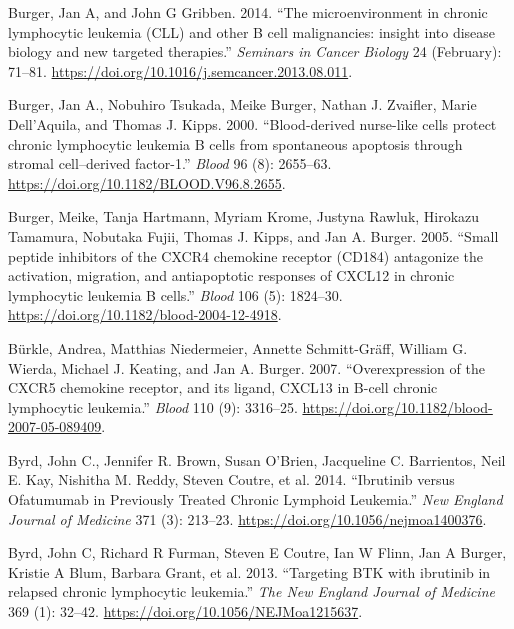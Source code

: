 \documentclass[11pt, a4paper, twosided]{book}
\newenvironment{CSLReferences}%
  {}%
  {\par}
\begin{document}
\begin{CSLReferences}{1}{0}
\leavevmode{}%
Burger, Jan A, and John G Gribben. 2014. {``{The microenvironment in chronic lymphocytic leukemia (CLL) and other B cell malignancies: insight into disease biology and new targeted therapies.}''} \emph{Seminars in Cancer Biology} 24 (February): 71--81. \url{https://doi.org/10.1016/j.semcancer.2013.08.011}.

\leavevmode{}%
Burger, Jan A., Nobuhiro Tsukada, Meike Burger, Nathan J. Zvaifler, Marie Dell'Aquila, and Thomas J. Kipps. 2000. {``{Blood-derived nurse-like cells protect chronic lymphocytic leukemia B cells from spontaneous apoptosis through stromal cell--derived factor-1}.''} \emph{Blood} 96 (8): 2655--63. \url{https://doi.org/10.1182/BLOOD.V96.8.2655}.

\leavevmode{}%
Burger, Meike, Tanja Hartmann, Myriam Krome, Justyna Rawluk, Hirokazu Tamamura, Nobutaka Fujii, Thomas J. Kipps, and Jan A. Burger. 2005. {``{Small peptide inhibitors of the CXCR4 chemokine receptor (CD184) antagonize the activation, migration, and antiapoptotic responses of CXCL12 in chronic lymphocytic leukemia B cells}.''} \emph{Blood} 106 (5): 1824--30. \url{https://doi.org/10.1182/blood-2004-12-4918}.

\leavevmode{}%
Bürkle, Andrea, Matthias Niedermeier, Annette Schmitt-Gräff, William G. Wierda, Michael J. Keating, and Jan A. Burger. 2007. {``{Overexpression of the CXCR5 chemokine receptor, and its ligand, CXCL13 in B-cell chronic lymphocytic leukemia}.''} \emph{Blood} 110 (9): 3316--25. \url{https://doi.org/10.1182/blood-2007-05-089409}.

\leavevmode{}%
Byrd, John C., Jennifer R. Brown, Susan O'Brien, Jacqueline C. Barrientos, Neil E. Kay, Nishitha M. Reddy, Steven Coutre, et al. 2014. {``{Ibrutinib versus Ofatumumab in Previously Treated Chronic Lymphoid Leukemia}.''} \emph{New England Journal of Medicine} 371 (3): 213--23. \url{https://doi.org/10.1056/nejmoa1400376}.

\leavevmode{}%
Byrd, John C, Richard R Furman, Steven E Coutre, Ian W Flinn, Jan A Burger, Kristie A Blum, Barbara Grant, et al. 2013. {``{Targeting BTK with ibrutinib in relapsed chronic lymphocytic leukemia.}''} \emph{The New England Journal of Medicine} 369 (1): 32--42. \url{https://doi.org/10.1056/NEJMoa1215637}.


\end{CSLReferences}
\end{document}
